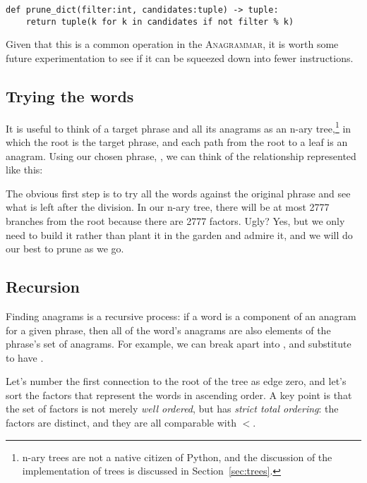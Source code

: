 \documentclass[letterpaper, 11pt]{article}
\providecommand{\anagrammar}{A\textsc{nagrammar}\xspace}
\begin{document}
\begin{verbatim}
def prune_dict(filter:int, candidates:tuple) -> tuple:
    return tuple(k for k in candidates if not filter % k)
\end{verbatim}

Given that this is a common operation in the \anagrammar, it is 
worth some future experimentation to see if it can be squeezed down
into fewer instructions.

\subsection{Trying the words}

It is useful to think of a target phrase and all its anagrams as an
n-ary tree,\footnote{n-ary trees are not a native citizen of Python,
and the discussion of the implementation of trees is discussed in 
Section~\ref{sec:trees}.} in which the root is the target phrase, and each path 
from the root to a leaf is an anagram. Using our chosen phrase,
, we can think of the relationship represented
like this:



The obvious first step is to try all the words against the original
phrase and see what is left after the division. In our n-ary tree,
there will be at most 2777 branches from the root because there
are 2777 factors. Ugly? Yes, but we only need to build it rather than
plant it in the garden and admire it, and we will do our best to prune
as we go.

\subsection{Recursion}

Finding anagrams is a recursive process: if a word is a component of an anagram
for a given phrase,
then all of the word's anagrams are also elements of the phrase's set of
anagrams. For example, we can break apart  into ,
and substitute to have .

Let's number the first connection to the root of the tree as edge zero, and
let's sort the factors that represent the words in ascending order. A key 
point is that the set of factors is not merely \emph{well ordered}, but 
has \emph{strict total ordering}: the factors are distinct, and they are all
comparable with $<$. 
\end{document}
